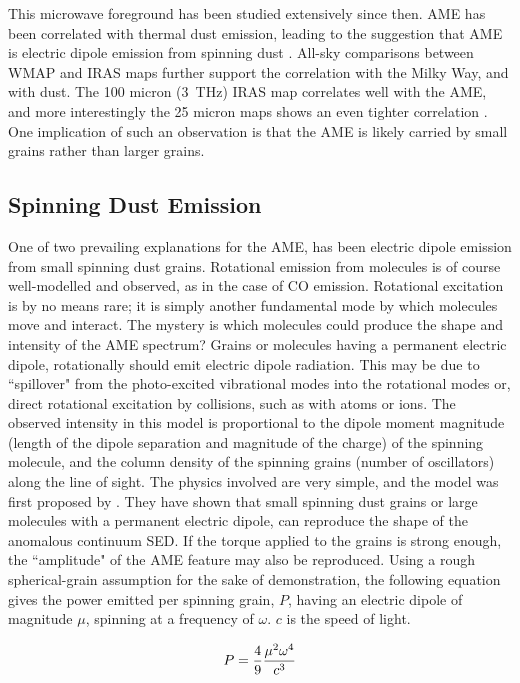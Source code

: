      This microwave foreground has been studied extensively since then. AME has been correlated with thermal dust emission, leading to the suggestion that AME is electric dipole emission from spinning dust \citep{draine98b}. All-sky comparisons between WMAP and IRAS maps further support the correlation with the Milky Way, and with dust. The 100 micron (3~THz) IRAS map correlates well with the AME, and more interestingly the 25 micron maps shows an even tighter correlation \citep{ysard10a}. One implication of such an observation is that the AME is likely carried by small grains rather than larger grains.
\subsection{Spinning Dust Emission}
\label{spinningdust}
     One of two prevailing explanations for the AME, has been electric dipole emission from small spinning dust grains. Rotational emission from molecules is of course well-modelled and observed, as in the case of CO emission. Rotational excitation is by no means rare; it is simply another fundamental mode by which molecules move and interact. The mystery is which molecules could produce the shape and intensity of the AME spectrum?
     Grains or molecules having a permanent electric dipole,  rotationally should emit electric dipole radiation. This may be due to ``spillover" from the photo-excited vibrational modes into the rotational modes or, direct rotational excitation by collisions, such as with atoms or ions. The observed intensity in this model is proportional to the dipole moment magnitude (length of the dipole separation and magnitude of the charge) of the spinning molecule, and the column density of the spinning grains (number of oscillators) along the line of sight. 
     The physics involved are very simple, and the model was first proposed by \cite{draine98a}. They have shown that small spinning dust grains or large molecules with a permanent electric dipole,  can reproduce the shape of the anomalous continuum SED. If the torque applied to the grains is strong enough, the ``amplitude" of the AME feature may also be reproduced. Using a rough spherical-grain assumption for the sake of demonstration, the following equation gives the power emitted per spinning grain, $P$, having an electric dipole of magnitude $\mu$, spinning at a frequency of $\omega$. $c$ is the speed of light. 
\begin{center}
\begin{equation}
P = {4\over9} {\mu^2\omega^4\over c^3}
\label{eq:Pspin}
\end{equation}
\end{center}
